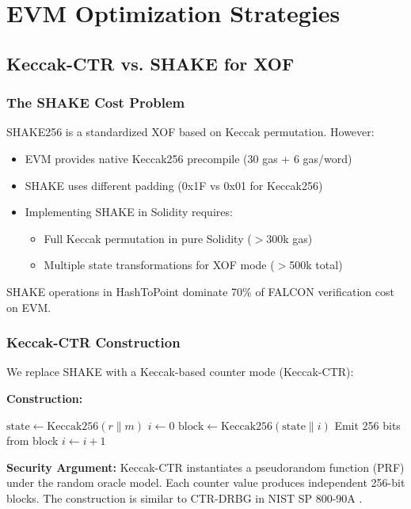 \section{EVM Optimization Strategies}


\subsection{Keccak-CTR vs. SHAKE for XOF}

\subsubsection{The SHAKE Cost Problem}

SHAKE256 is a standardized XOF based on Keccak permutation. However:
\begin{itemize}
    \item EVM provides native Keccak256 precompile (30 gas + 6 gas/word)
    \item SHAKE uses different padding (0x1F vs 0x01 for Keccak256)
    \item Implementing SHAKE in Solidity requires:
    \begin{itemize}
        \item Full Keccak permutation in pure Solidity ($>$300k gas)
        \item Multiple state transformations for XOF mode ($>$500k total)
    \end{itemize}
\end{itemize}

SHAKE operations in HashToPoint dominate 70\% of FALCON verification cost on EVM.

\subsubsection{Keccak-CTR Construction}

We replace SHAKE with a Keccak-based counter mode (Keccak-CTR):

\textbf{Construction:}
\begin{algorithmic}[1]
\STATE $\text{state} \gets \text{Keccak256}(r \| m)$
\STATE $i \gets 0$
    \STATE $\text{block} \gets \text{Keccak256}(\text{state} \| i)$
    \STATE Emit 256 bits from block
    \STATE $i \gets i + 1$
\ENDWHILE
\end{algorithmic}

\textbf{Security Argument:} Keccak-CTR instantiates a pseudorandom function (PRF) under the random oracle model. Each counter value produces independent 256-bit blocks. The construction is similar to CTR-DRBG in NIST SP 800-90A \cite{nist800-90a}.

